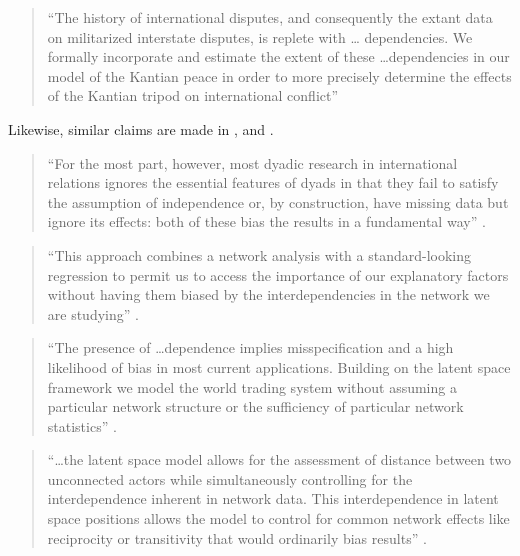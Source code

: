 \documentclass[11pt]{article}
\begin{document}
\begin{quote}
``The history of international disputes, and consequently the extant
  data on militarized interstate disputes, is replete with \ldots
  dependencies. We formally incorporate and estimate the extent of
  these \ldots dependencies in our model of the Kantian peace in order
  to more precisely determine the effects of the Kantian tripod on
  international conflict'' \citep[p. 585]{ward2007disputes}
\end{quote}

Likewise, similar claims are made in \citet{dorff2013networks,
  cao2013democracies, ward2013gravity, kirkland2012multimember}, and
\citet{cao2016transnational}.

\begin{quote}
``For the most part, however, most dyadic research in international
  relations ignores the essential features of dyads in that they fail
  to satisfy the assumption of independence or, by construction, have
  missing data but ignore its effects: both of these bias the results
  in a fundamental way'' \citep[p. 2]{dorff2013networks}.
\end{quote}

\begin{quote}
``This approach combines a network analysis with a standard-looking
  regression to permit us to access the importance of our explanatory
  factors without having them biased by the interdependencies in the
  network we are studying'' \citep[p. 15]{cao2013democracies}.
\end{quote}

\begin{quote}
``The presence of \ldots dependence implies misspecification and a
  high likelihood of bias in most current applications. Building on
  the latent space framework we model the world trading system without
  assuming a particular network structure or the sufficiency of
  particular network statistics'' \citep[p. 20]{ward2013gravity}.
\end{quote}

\begin{quote}
``\ldots the latent space model allows for the assessment of distance
  between two unconnected actors while simultaneously controlling for
  the interdependence inherent in network data. This interdependence
  in latent space positions allows the model to control for common
  network effects like reciprocity or transitivity that would
  ordinarily bias results'' \citep[p. 336]{kirkland2012multimember}.
\end{quote}
\end{document}
